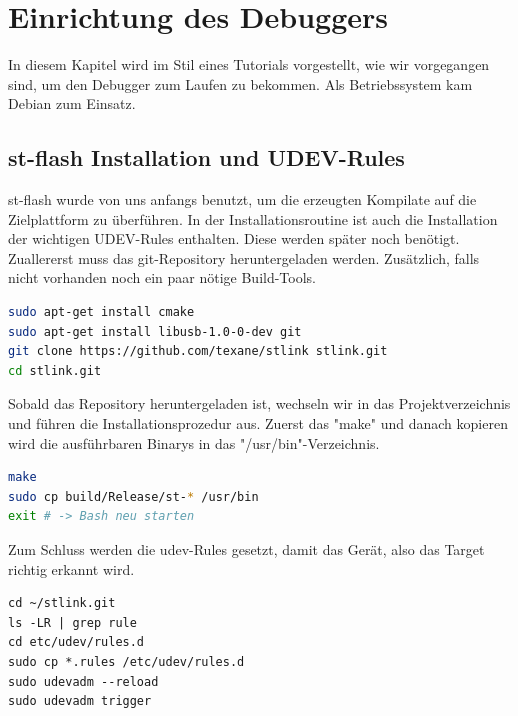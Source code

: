 \documentclass[12pt,a4paper]{article}
\author{Jonathan Weißenberger}
\begin{document}
\section{Einrichtung des Debuggers}
In diesem Kapitel wird im Stil eines Tutorials vorgestellt, wie wir vorgegangen sind, um den Debugger zum Laufen zu bekommen. Als Betriebssystem kam Debian zum Einsatz.
\subsection{st-flash Installation und UDEV-Rules}
st-flash wurde von uns anfangs benutzt, um die erzeugten Kompilate auf die Zielplattform zu überführen. In der Installationsroutine ist auch die Installation der wichtigen UDEV-Rules enthalten. Diese werden später noch benötigt.
Zuallererst muss das git-Repository heruntergeladen werden. Zusätzlich, falls nicht vorhanden noch ein paar nötige Build-Tools.
\begin{lstlisting}[language=sh]
sudo apt-get install cmake
sudo apt-get install libusb-1.0-0-dev git
git clone https://github.com/texane/stlink stlink.git
cd stlink.git
\end{lstlisting}
Sobald das Repository heruntergeladen ist, wechseln wir in das Projektverzeichnis und führen die Installationsprozedur aus. Zuerst das "make" und danach kopieren wird die ausführbaren Binarys in das "/usr/bin"-Verzeichnis.
\begin{lstlisting}[language=sh]
make
sudo cp build/Release/st-* /usr/bin
exit # -> Bash neu starten
\end{lstlisting}
Zum Schluss werden die udev-Rules gesetzt, damit das Gerät, also das Target richtig erkannt wird.
\begin{lstlisting}
cd ~/stlink.git
ls -LR | grep rule
cd etc/udev/rules.d
sudo cp *.rules /etc/udev/rules.d
sudo udevadm --reload
sudo udevadm trigger
\end{lstlisting}
\end{document}
